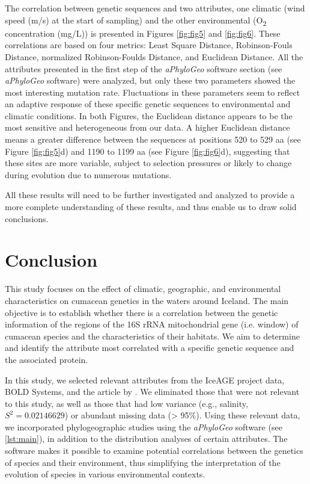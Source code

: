 The correlation between genetic sequences and two attributes, one climatic (wind speed (m/s) at the start of sampling) and the other environmental (O\textsubscript{2} concentration (mg/L)) is presented in Figures \ref{fig:fig5} and \ref{fig:fig6}. These correlations are based on four metrics: Least Square Distance, Robinson-Fouls Distance, normalized Robinson-Foulds Distance, and Euclidean Distance. All the attributes presented in the first step of the \textit{aPhyloGeo} software section (see \textit{aPhyloGeo} software) were analyzed, but only these two parameters showed the most interesting mutation rate. Fluctuations in these parameters seem to reflect an adaptive response of these specific genetic sequences to environmental and climatic conditions. In both Figures, the Euclidean distance appears to be the most sensitive and heterogeneous from our data. A higher Euclidean distance means a greater difference between the sequences at positions 520 to 529 aa (see Figure \ref{fig:fig5}d) and 1190 to 1199 aa (see Figure \ref{fig:fig6}d), suggesting that these sites are more variable, subject to selection pressures or likely to change during evolution due to numerous mutations. 

All these results will need to be further investigated and analyzed to provide a more complete understanding of these results, and thus enable us to draw solid conclusions.

\section{Conclusion}\label{conclusion}

This study focuses on the effect of climatic, geographic, and environmental characteristics on cumacean genetics in the waters around Iceland. The main objective is to establish whether there is a correlation between the genetic information of the regions of the 16S rRNA mitochondrial gene (i.e. window) of cumacean species and the characteristics of their habitats. We aim to determine and identify the attribute most correlated with a specific genetic sequence and the associated protein. 

In this study, we selected relevant attributes from the IceAGE project data, BOLD Systems, and the article by \citep{uhlir_adding_2021}. We eliminated those that were not relevant to this study, as well as those that had low variance (e.g., salinity, $S^2 = 0.02146629$) or abundant missing data (> 95\%). Using these relevant data, we incorporated phylogeographic studies using the \textit{aPhyloGeo} software (see \autoref{lst:main}), in addition to the distribution analyses of certain attributes. The software makes it possible to examine potential correlations between the genetics of species and their environment, thus simplifying the interpretation of the evolution of species in various environmental contexts.

